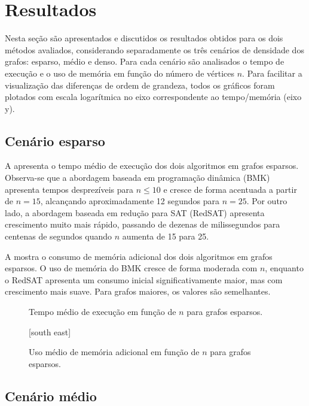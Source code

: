 \section{Resultados} \label{sec:resultados}

Nesta seção são apresentados e discutidos os resultados obtidos para os dois métodos avaliados, considerando separadamente os três cenários de densidade dos grafos: esparso, médio e denso. Para cada cenário são analisados o tempo de execução e o uso de memória em função do número de vértices $n$. Para facilitar a visualização das diferenças de ordem de grandeza, todos os gráficos foram plotados com escala logarítmica no eixo correspondente ao tempo/memória (eixo y).

\subsection{Cenário esparso}

A  apresenta o tempo médio de execução dos dois algoritmos em grafos esparsos. Observa-se que a abordagem baseada em programação dinâmica (BMK) apresenta tempos desprezíveis para $n \leq 10$ e cresce de forma acentuada a partir de $n = 15$, alcançando aproximadamente 12 segundos para $n = 25$. Por outro lado, a abordagem baseada em redução para SAT (RedSAT) apresenta crescimento muito mais rápido, passando de dezenas de milissegundos para centenas de segundos quando $n$ aumenta de 15 para 25.

A  mostra o consumo de memória adicional dos dois algoritmos em grafos esparsos. O uso de memória do BMK cresce de forma moderada com $n$, enquanto o RedSAT apresenta um consumo inicial significativamente maior, mas com crescimento mais suave. Para grafos maiores, os valores são semelhantes.

\begin{figure}[H]
    \centering
    \caption{Tempo médio de execução em função de $n$ para grafos esparsos.}
    \label{fig:esparso-tempo}
\end{figure}

\begin{figure}[H]
    \centering
    [south east]
    \caption{Uso médio de memória adicional em função de $n$ para grafos esparsos.}
    \label{fig:esparso-memoria}
\end{figure}

\subsection{Cenário médio}

